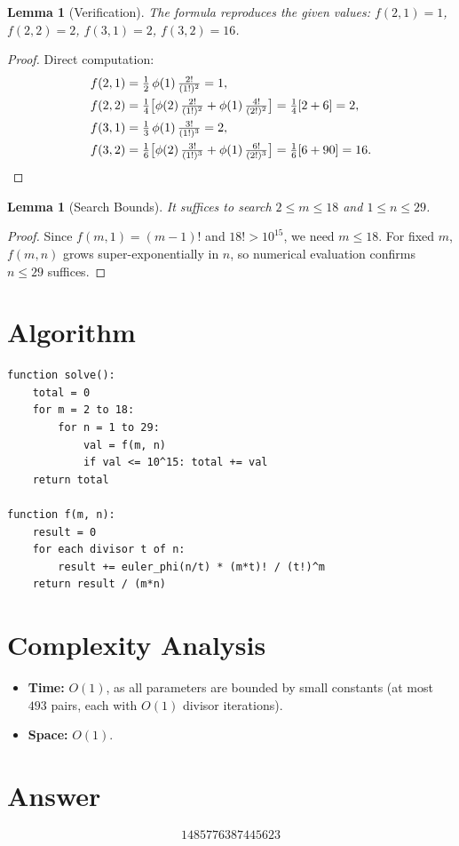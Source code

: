 \documentclass[12pt]{article}
\newtheorem{lemma}[theorem]{Lemma}
\begin{document}
\begin{lemma}[Verification]
The formula reproduces the given values: $f(2,1)=1$, $f(2,2)=2$, $f(3,1)=2$, $f(3,2)=16$.
\end{lemma}

\begin{proof}
Direct computation:
\begin{align*}
f(2,1) &= \tfrac{1}{2}\,\phi(1)\,\tfrac{2!}{(1!)^2} = 1, \\
f(2,2) &= \tfrac{1}{4}\bigl[\phi(2)\,\tfrac{2!}{(1!)^2} + \phi(1)\,\tfrac{4!}{(2!)^2}\bigr] = \tfrac{1}{4}[2+6] = 2, \\
f(3,1) &= \tfrac{1}{3}\,\phi(1)\,\tfrac{3!}{(1!)^3} = 2, \\
f(3,2) &= \tfrac{1}{6}\bigl[\phi(2)\,\tfrac{3!}{(1!)^3} + \phi(1)\,\tfrac{6!}{(2!)^3}\bigr] = \tfrac{1}{6}[6+90] = 16. \qedhere
\end{align*}
\end{proof}

\begin{lemma}[Search Bounds]
It suffices to search $2 \le m \le 18$ and $1 \le n \le 29$.
\end{lemma}

\begin{proof}
Since $f(m,1) = (m-1)!$ and $18! > 10^{15}$, we need $m \le 18$. For fixed $m$, $f(m,n)$ grows super-exponentially in $n$, so numerical evaluation confirms $n \le 29$ suffices.
\end{proof}

\section{Algorithm}

\begin{verbatim}
function solve():
    total = 0
    for m = 2 to 18:
        for n = 1 to 29:
            val = f(m, n)
            if val <= 10^15: total += val
    return total

function f(m, n):
    result = 0
    for each divisor t of n:
        result += euler_phi(n/t) * (m*t)! / (t!)^m
    return result / (m*n)
\end{verbatim}

\section{Complexity Analysis}

\begin{itemize}
\item \textbf{Time:} $O(1)$, as all parameters are bounded by small constants (at most $493$ pairs, each with $O(1)$ divisor iterations).
\item \textbf{Space:} $O(1)$.
\end{itemize}

\section{Answer}

\[
\boxed{1485776387445623}
\]
\end{document}
